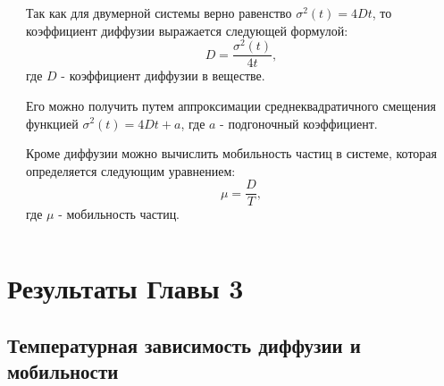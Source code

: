 \documentclass[pdf,hyperref={unicode}]{beamer}
\begin{document}
\begin{frame}
\begin{columns}
\begin{column}{0.6\linewidth}
\end{column}
\begin{column}{0.5\linewidth}
\tiny{

Так как для двумерной системы верно равенство $\sigma^2(t) = 4Dt$, то коэффициент диффузии выражается следующей формулой:
\begin{equation}
    D = \frac{\sigma^2(t)}{4t},
    \label{eqD}
\end{equation}
где $D$ - коэффициент диффузии в веществе.

Его можно получить путем аппроксимации среднеквадратичного смещения функцией $\sigma^2(t) = 4Dt + a$, где $a$ - подгоночный коэффициент.

Кроме диффузии можно вычислить мобильность частиц в системе, которая определяется следующим уравнением:
\begin{equation}
    \mu  = \frac{D}{T},
    \label{eqMuDiff}
\end{equation}
где $\mu$ - мобильность частиц.
}
\end{column}

\end{columns}
\end{frame}


\section{Результаты Главы 3}
\subsection{Температурная зависимость диффузии и мобильности}
\end{document}
